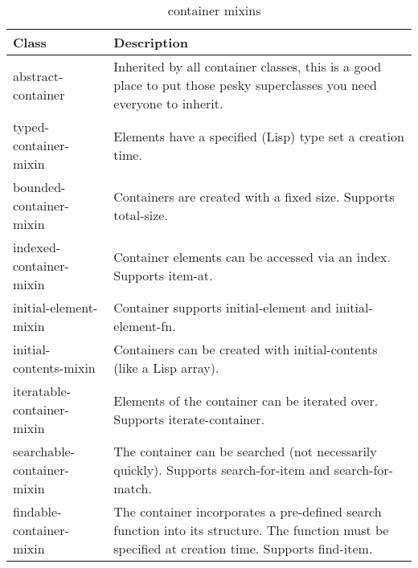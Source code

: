\documentclass{acm_proc_article-sp}
\begin{document}
\begin{table*}[htb]
\begin{center}
\begin{tabular}{|lp{3 in}|} \hline
Class & \vline \quad Description \\ \hline
\hline

abstract-container & Inherited by all container classes, this 
is a good place to put those pesky superclasses you need everyone to
inherit. \\

typed-container-mixin & Elements have a specified (Lisp) type set a
creation time. \\

bounded-container-mixin & Containers are created with a fixed size.
Supports total-size. \\

indexed-container-mixin & Container elements can be accessed via
an index. Supports item-at. \\

initial-element-mixin & Container supports initial-element and
initial-element-fn. \\

initial-contents-mixin & Containers can be created with initial-contents
(like a Lisp array). \\

iteratable-container-mixin & Elements of the container can be iterated
over. Supports iterate-container. \\

searchable-container-mixin & The container can be searched (not
necessarily quickly). Supports search-for-item and search-for-match. \\

findable-container-mixin & The container incorporates a pre-defined
search function into its structure. The function must be specified at
creation time. Supports find-item. \\
\hline
\end{tabular}
\end{center}
\caption{\clcl~ container mixins}
\label{tbl:container-mixins}
\end{table*}
\end{document}
